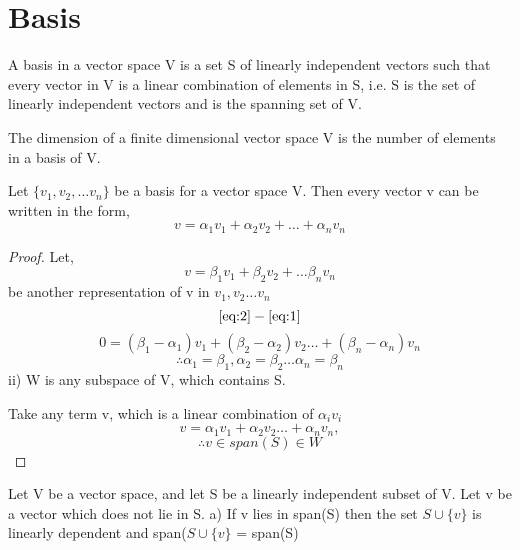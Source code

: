 \documentclass{report}
\begin{document}
\section{Basis}
\begin{definition}[Basis]
    A basis in a vector space V is a set S of linearly independent vectors such that every vector in V is a linear combination of elements in S, i.e. S is the set of linearly independent vectors and is the spanning set of V.
\end{definition}
\begin{definition}[Dimension]
    The dimension of a finite dimensional vector space V is the number of elements in a basis of V.
\end{definition}
\begin{lemma}
    Let $\{v_1,v_2,\dots v_n\}$ be a basis for a vector space V. Then every vector v can be written in the form,
    \begin{equation}
        v = \alpha_1 v_1 + \alpha_2 v_2 + \dots + \alpha_nv_n 
        \label{eq:1}
    \end{equation}
\end{lemma}
\begin{proof}
    Let, 
    \begin{equation}
        v = \beta_1v_1+\beta_2 v_2 + \dots \beta_n v_n
        \label{eq:2}
    \end{equation}
    be another representation of v in $v_1,v_2 \dots v_n$
    \[
        \ref{eq:2} - \ref{eq:1}
    \]
    \[
        0 = (\beta_1 - \alpha_1)v_1 + (\beta_2 - \alpha_2)v_2 \dots + (\beta_n - \alpha_n)v_n
    \]    
    \[
        \therefore \alpha_1 = \beta_1, \alpha_2 = \beta_2 \dots \alpha_n = \beta_n
    \]
    ii) W is any subspace of V, which contains S. 

    Take any term v, which is a linear combination of $\alpha_i v_i$
    \[
        v = \alpha_1 v_1 + \alpha_2 v_2 \dots + \alpha_n v_n ,
    \]
    \[
       \therefore v \in span(S) \in W
    \]
\end{proof}
\begin{theorem}
    Let V be a vector space, and let S be a linearly independent subset of V. Let v be a vector which does not lie in S.
    a) If v lies in span(S) then the set $S \cup \{v\}$ is linearly dependent and span($S \cup \{v\}$ = span(S)
\end{theorem}
\end{document}
